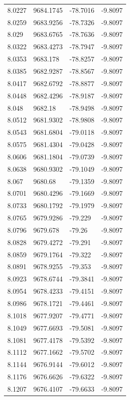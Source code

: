 \begin{table}[H]
\begin{tabular}{llll}
8.0227 & 9684.1745 & -78.7016 & -9.8097 \\
8.0259 & 9683.9256 & -78.7326 & -9.8097 \\
8.029 & 9683.6765 & -78.7636 & -9.8097 \\
8.0322 & 9683.4273 & -78.7947 & -9.8097 \\
8.0353 & 9683.178 & -78.8257 & -9.8097 \\
8.0385 & 9682.9287 & -78.8567 & -9.8097 \\
8.0417 & 9682.6792 & -78.8877 & -9.8097 \\
8.0448 & 9682.4296 & -78.9187 & -9.8097 \\
8.048 & 9682.18 & -78.9498 & -9.8097 \\
8.0512 & 9681.9302 & -78.9808 & -9.8097 \\
8.0543 & 9681.6804 & -79.0118 & -9.8097 \\
8.0575 & 9681.4304 & -79.0428 & -9.8097 \\
8.0606 & 9681.1804 & -79.0739 & -9.8097 \\
8.0638 & 9680.9302 & -79.1049 & -9.8097 \\
8.067 & 9680.68 & -79.1359 & -9.8097 \\
8.0701 & 9680.4296 & -79.1669 & -9.8097 \\
8.0733 & 9680.1792 & -79.1979 & -9.8097 \\
8.0765 & 9679.9286 & -79.229 & -9.8097 \\
8.0796 & 9679.678 & -79.26 & -9.8097 \\
8.0828 & 9679.4272 & -79.291 & -9.8097 \\
8.0859 & 9679.1764 & -79.322 & -9.8097 \\
8.0891 & 9678.9255 & -79.353 & -9.8097 \\
8.0923 & 9678.6744 & -79.3841 & -9.8097 \\
8.0954 & 9678.4233 & -79.4151 & -9.8097 \\
8.0986 & 9678.1721 & -79.4461 & -9.8097 \\
8.1018 & 9677.9207 & -79.4771 & -9.8097 \\
8.1049 & 9677.6693 & -79.5081 & -9.8097 \\
8.1081 & 9677.4178 & -79.5392 & -9.8097 \\
8.1112 & 9677.1662 & -79.5702 & -9.8097 \\
8.1144 & 9676.9144 & -79.6012 & -9.8097 \\
8.1176 & 9676.6626 & -79.6322 & -9.8097 \\
8.1207 & 9676.4107 & -79.6633 & -9.8097 \\

\end{tabular}
\end{table}

